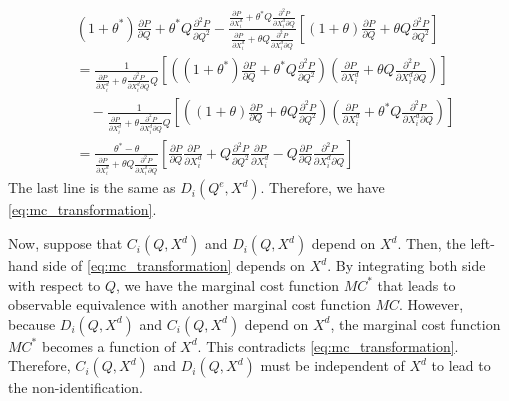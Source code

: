 \documentclass[11pt, a4paper]{article}
\theoremstyle{remark}
\begin{document}
\begin{align}
    & (1+ \theta^{*})\frac{\partial P}{\partial Q} + \theta^{*} Q\frac{\partial^2 P}{\partial Q^2} - \frac{\frac{\partial P}{\partial X^{d}_i} + \theta^{*} Q\frac{\partial^2 P}{\partial X^{d}_{i}\partial Q} }{\frac{\partial P}{\partial X^{d}_i} + \theta Q\frac{\partial^2 P}{\partial X^{d}_{i}\partial Q} }\left[(1+ \theta) \frac{\partial P}{\partial Q} + \theta Q\frac{\partial^2 P}{\partial Q^2}\right]\\
    &= \frac{1}{\frac{\partial P}{\partial X^{d}_i} + \theta\frac{\partial^2 P}{\partial X^{d}_{i}\partial Q}Q}\left[\left((1 + \theta^{*}) \frac{\partial P}{\partial Q} + \theta^{*} Q\frac{\partial^2 P}{\partial  Q^2}\right)\left(\frac{\partial P}{\partial X^{d}_i} + \theta Q\frac{\partial^2 P}{\partial X^{d}_{i}\partial Q}\right)\right]\\
    &\quad - \frac{1}{\frac{\partial P}{\partial X^{d}_i} + \theta\frac{\partial^2 P}{\partial X^{d}_{i}\partial Q}Q}\left[\left( (1 + \theta) \frac{\partial P}{\partial Q} + \theta Q\frac{\partial^2 P}{\partial Q^2}\right)\left(\frac{\partial P}{\partial X^{d}_i} + \theta^{*} Q\frac{\partial^2 P}{\partial X^{d}_{i}\partial Q}\right)\right]\\
    & = \frac{\theta^{*} - \theta}{\frac{\partial P}{\partial X^{d}_i} + \theta Q\frac{\partial^2 P}{\partial X^{d}_{i}\partial Q}}\left[\frac{\partial P}{\partial Q} \frac{\partial P}{\partial X^{d}_i} + Q\frac{\partial^2 P}{\partial Q^2} \frac{\partial P}{\partial X^{d}_i} - Q \frac{\partial P}{\partial Q} \frac{\partial^2 P}{\partial X^{d}_i\partial Q} \right]
\end{align}
The last line is the same as $D_i(Q^e, X^{d})$.
Therefore, we have \eqref{eq:mc_transformation}.

Now, suppose that $C_i(Q, X^{d})$ and $D_i(Q, X^{d})$ depend on $X^{d}$.
Then, the left-hand side of \eqref{eq:mc_transformation} depends on $X^{d}$.
By integrating both side with respect to $Q$, we have the marginal cost function $MC^{*}$ that leads to observable equivalence with another marginal cost function $MC$.
However, because $D_i(Q, X^{d})$ and $C_i(Q, X^{d})$ depend on $X^{d}$, the marginal cost function $MC^{*}$ becomes a function of $X^{d}$.
This contradicts \eqref{eq:mc_transformation}.
Therefore, $C_i(Q, X^{d})$ and $D_i(Q, X^{d})$ must be independent of $X^{d}$ to lead to the non-identification.
\end{document}
